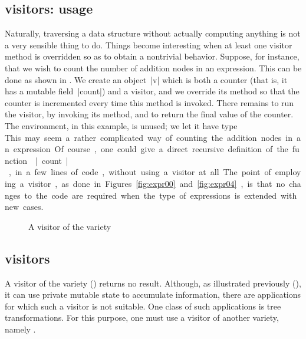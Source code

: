 \documentclass[11pt,a4paper,twoside]{article}
\begin{document}
\subsection{\iter visitors: usage}
\label{sec:intro:iter:usage}

Naturally, traversing a data structure without actually computing anything is
not a very sensible thing to do. Things become interesting when at least one
visitor method is overridden so as to obtain a nontrivial behavior. Suppose,
for instance, that we wish to count the number of addition nodes in an
expression. This can be done as shown in . We create an
object~\oc|v| which is both a counter (that is, it has a mutable
field~\oc|count|) and a visitor, and we override its method
 so that the counter is incremented every time this
method is invoked. There remains to run the visitor, by invoking its
 method, and to return the final value of the counter. The
environment, in this example, is unused; we let it have type \unit.

This may seem a rather complicated way of counting the addition nodes in an
expression. Of course, one could give a direct recursive definition of the
function \oc|count|, in a few lines of code, without using a visitor at all.
The point of employing a visitor, as done in Figures~\ref{fig:expr00}
and~\ref{fig:expr04}, is that no changes to the code are required when the
type of expressions is extended with new cases.


\begin{figure}[t]
\vspace{-\baselineskip}
\caption{A visitor of the \map variety}
\label{fig:expr01}
\end{figure}

\subsection{\map visitors}
\label{sec:intro:map}

A visitor of the \iter variety () returns no result.
Although, as illustrated previously (), it can use
private mutable state to accumulate information, there are applications for
which such a visitor is not suitable. One class of such applications is tree
transformations. For this purpose, one must use a visitor of another variety,
namely \map.
\end{document}
